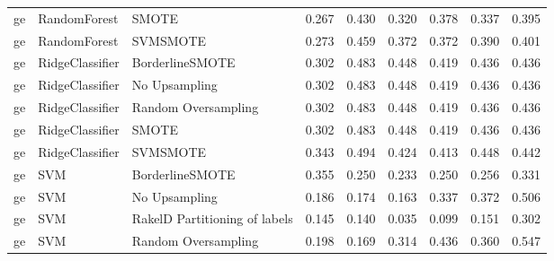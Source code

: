 \begin{tabular}{lllllllll}
      ge &                    RandomForest &                         SMOTE & 0.267 &                     0.430 &                 0.320 &                  0.378 &                                   0.337 &     0.395 \\
      ge &                    RandomForest &                      SVMSMOTE & 0.273 &                     0.459 &                 0.372 &                  0.372 &                                   0.390 &     0.401 \\
      ge &                 RidgeClassifier &               BorderlineSMOTE & 0.302 &                     0.483 &                 0.448 &                  0.419 &                                   0.436 &     0.436 \\
      ge &                 RidgeClassifier &                 No Upsampling & 0.302 &                     0.483 &                 0.448 &                  0.419 &                                   0.436 &     0.436 \\
      ge &                 RidgeClassifier &           Random Oversampling & 0.302 &                     0.483 &                 0.448 &                  0.419 &                                   0.436 &     0.436 \\
      ge &                 RidgeClassifier &                         SMOTE & 0.302 &                     0.483 &                 0.448 &                  0.419 &                                   0.436 &     0.436 \\
      ge &                 RidgeClassifier &                      SVMSMOTE & 0.343 &                     0.494 &                 0.424 &                  0.413 &                                   0.448 &     0.442 \\
      ge &                             SVM &               BorderlineSMOTE & 0.355 &                     0.250 &                 0.233 &                  0.250 &                                   0.256 &     0.331 \\
      ge &                             SVM &                 No Upsampling & 0.186 &                     0.174 &                 0.163 &                  0.337 &                                   0.372 &     0.506 \\
      ge &                             SVM & RakelD Partitioning of labels & 0.145 &                     0.140 &                 0.035 &                  0.099 &                                   0.151 &     0.302 \\
      ge &                             SVM &           Random Oversampling & 0.198 &                     0.169 &                 0.314 &                  0.436 &                                   0.360 &     0.547 \\

\end{tabular}
